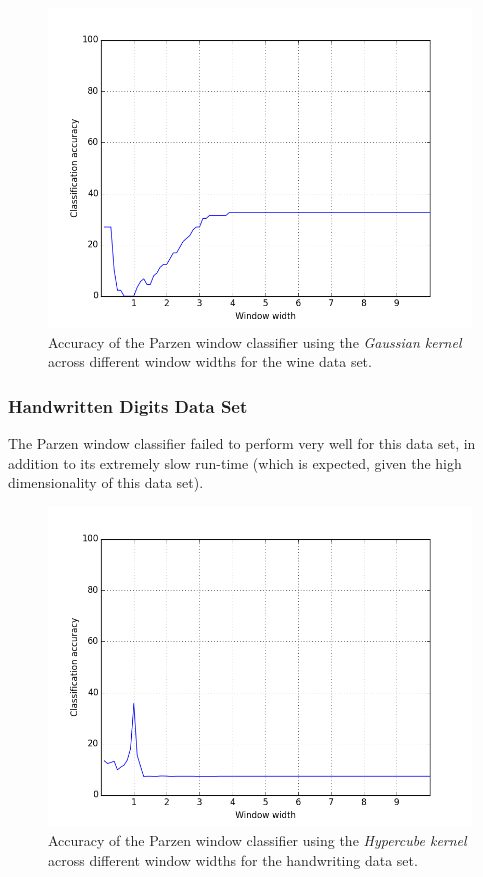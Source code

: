 \documentclass{article}
\numberwithin{figure}{section}
\newcommand{\imgwidth}{.8\textwidth}
\begin{document}
\begin{figure}[H]
\centering
\includegraphics[width=\imgwidth]{pg_wine}
\caption{Accuracy of the Parzen window classifier using the \emph{Gaussian kernel} across different window widths for the wine data set.}
\label{pg_wine}
\end{figure}


\subsubsection{Handwritten Digits Data Set}
The Parzen window classifier failed to perform very well for this data set, in addition to its extremely slow run-time (which is expected, given the high dimensionality of this data set).

\begin{figure}[H]
\centering
\includegraphics[width=\imgwidth]{pb_hand}
\caption{Accuracy of the Parzen window classifier using the \emph{Hypercube kernel} across different window widths for the handwriting data set.}
\label{pb_hand}
\end{figure}
\end{document}
